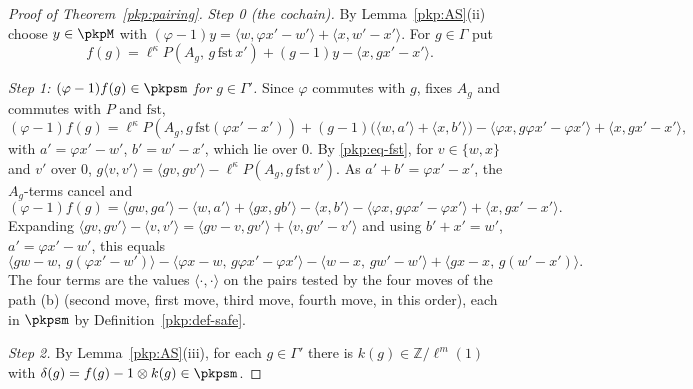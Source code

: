 \documentclass[10pt]{amsart}
\theoremstyle{definition}
\theoremstyle{remark}
\newcommand{\Z}{\mathbb Z}
\begin{document}
\begin{proof}[Proof of Theorem~\ref{pkp:pairing}]
\emph{Step 0 (the cochain).} By Lemma~\ref{pkp:AS}(ii) choose $y\in\pkpM$ with
$(\varphi-1)y=\langle w,\varphi x'-w'\rangle+\langle x,w'-x'\rangle$. For $g\in\Gamma$ put
\[
f(g)=\ell^\kappa P(A_g,\,g\,\mathrm{fst}\,x')+(g-1)y-\langle x,gx'-x'\rangle .
\]

\emph{Step 1: $(\varphi-1)f(g)\in\pkpsm$ for $g\in\Gamma'$.} Since $\varphi$ commutes with $g$,
fixes $A_g$ and commutes with $P$ and $\mathrm{fst}$,
\[
(\varphi-1)f(g)=\ell^\kappa P(A_g,g\,\mathrm{fst}(\varphi x'-x'))+(g-1)\bigl(\langle
w,a'\rangle+\langle x,b'\rangle\bigr)-\langle\varphi x,g\varphi x'-\varphi x'\rangle+\langle
x,gx'-x'\rangle,
\]
with $a'=\varphi x'-w'$, $b'=w'-x'$, which lie over $0$. By \eqref{pkp:eq-fst}, for $v\in\{w,x\}$ and
$v'$ over $0$, $g\langle v,v'\rangle=\langle gv,gv'\rangle-\ell^\kappa P(A_g,g\,\mathrm{fst}\,v')$. As
$a'+b'=\varphi x'-x'$, the $A_g$-terms cancel and
\[
(\varphi-1)f(g)=\langle gw,ga'\rangle-\langle w,a'\rangle+\langle gx,gb'\rangle-\langle
x,b'\rangle-\langle\varphi x,g\varphi x'-\varphi x'\rangle+\langle x,gx'-x'\rangle .
\]
Expanding $\langle gv,gv'\rangle-\langle v,v'\rangle=\langle gv-v,gv'\rangle+\langle v,gv'-v'\rangle$
and using $b'+x'=w'$, $a'=\varphi x'-w'$, this equals
\[
\langle gw-w,\,g(\varphi x'-w')\rangle-\langle\varphi x-w,\,g\varphi x'-\varphi x'\rangle-\langle
w-x,\,gw'-w'\rangle+\langle gx-x,\,g(w'-x')\rangle .
\]
The four terms are the values $\langle\cdot,\cdot\rangle$ on the pairs tested by the four moves of the path
(b) (second move, first move, third move, fourth move, in this order), each in $\pkpsm$ by
Definition~\ref{pkp:def-safe}.

\emph{Step 2.} By Lemma~\ref{pkp:AS}(iii), for each $g\in\Gamma'$ there is $k(g)\in\Z/\ell^m(1)$ with
$\delta(g)=f(g)-1\otimes k(g)\in\pkpsm$.


\end{proof}
\end{document}
